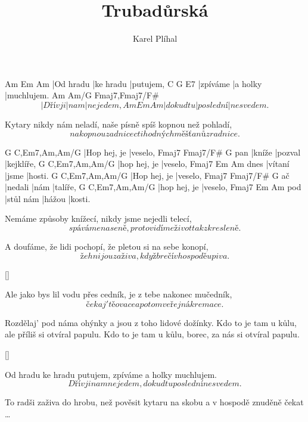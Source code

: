 \documentclass{song}
\title{Trubadůrská}
\author{Karel Plíhal}
\begin{document}
\begin{multicols}{2}

\strophe
Am        Em        Am
|Od hradu |ke hradu |putujem,
C        G        E7
|zpíváme |a holky |muchlujem.
   Am      Am/G Fmaj7,Fmaj7/F\#
\[ |Dřív ji|nam |nejedem,
Am        Em        Am
|dokud tu |poslední |nesvedem. \]
\endstrophe

\strophe*
Kytary nikdy nám neladí,
naše písně spíš kopnou než pohladí,
\[ nakopnou zadnice
ctihodných měšťanů z radnice. \]
\endstrophe

G            C,Em7,Am,Am/G
|Hop hej, je |veselo,
    Fmaj7 Fmaj7/F\# G
pan |kníže |pozval |kejklíře,
G            C,Em7,Am,Am/G
|hop hej, je |veselo,
     Fmaj7   Em    Am
dnes |vítaní |jsme |hosti.
G            C,Em7,Am,Am/G
|Hop hej, je |veselo,
   Fmaj7   Fmaj7/F\# G
ač |nedali |nám |talíře,
G            C,Em7,Am,Am/G
|hop hej, je |veselo,
    Fmaj7     Em     Am
pod |stůl nám |hážou |kosti.
\endstrophe

\strophe*
Nemáme způsoby knížecí,
nikdy jsme nejedli telecí,
\[ spáváme na seně,
proto vidíme život tak zkresleně. \]
\endstrophe

\strophe*
A doufáme, že lidi pochopí,
že pletou si na sebe konopí,
\[ že hnijou zaživa,
když brečí v hospodě u piva. \]
\endstrophe

\ref{}

\columnbreak

\strophe*
Ale jako bys lil vodu přes cedník,
je z tebe nakonec mučedník,
\[ čekaj' tě ovace
a potom veřejná kremace. \]
\endstrophe

\strophe*
Rozdělaj' pod náma ohýnky
a jsou z toho lidové dožínky.
Kdo to je tam u kůlu,
ale příliš si otvíral papulu.
Kdo to je tam u kůlu,
borec, za nás si otvíral papulu.
\endstrophe

\ref{}

\strophe*
Od hradu ke hradu putujem,
zpíváme a holky muchlujem.
\[ Dřív jinam   nejedem,
dokud tu poslední nesvedem. \]
\endstrophe

\strophe*
To radši zaživa do hrobu,
než pověsit kytaru na skobu
a v hospodě znuděně čekat \ldots
\endstrophe

\end{multicols}
\end{document}
